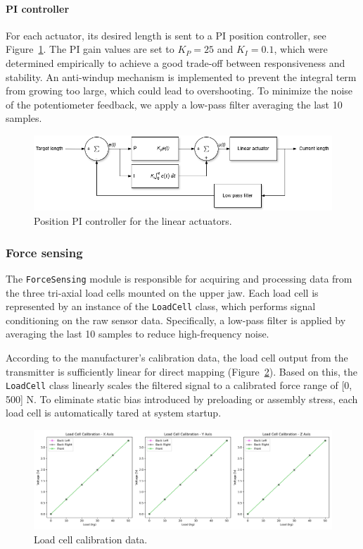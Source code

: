 \paragraph{PI controller}
For each actuator, its desired length is sent to a PI position controller, see Figure~\ref{fig:actuator_pi}. The PI gain values 
are set to $K_P=25$ and $K_I=0.1$, which were determined empirically to achieve a good trade-off between responsiveness and stability. 
An anti-windup mechanism is implemented to prevent the integral term from growing too large, which could lead to overshooting. 
To minimize the noise of the potentiometer feedback, we apply a low-pass filter averaging the last 10 samples.
\begin{figure}[H]
\centering
\includegraphics[width=\textwidth]{figures/actuator_pi.drawio.png}
\caption{Position PI controller for the linear actuators.}
\label{fig:actuator_pi}
\end{figure}

\subsubsection{Force sensing}
The \texttt{ForceSensing} module is responsible for acquiring and processing data from the three tri-axial load cells mounted on the upper jaw. 
Each load cell is represented by an instance of the \texttt{LoadCell} class, which performs signal conditioning on the raw sensor data. 
Specifically, a low-pass filter is applied by averaging the last 10 samples to reduce high-frequency noise.

According to the manufacturer's calibration data, the load cell output from the transmitter is sufficiently linear for direct mapping 
(Figure~\ref{fig:load_cell_calibration}). Based on this, the \texttt{LoadCell} class linearly scales the filtered signal to a calibrated 
force range of [0, 500] N. To eliminate static bias introduced by preloading or assembly stress, each load cell is automatically tared at system startup.

\begin{figure}[H]
\centering
\includegraphics[width=\textwidth]{figures/load_cell_calibration.png}
\caption{Load cell calibration data.}
\label{fig:load_cell_calibration}
\end{figure}

